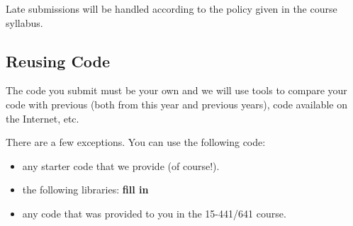 	Late submissions will be handled according to the policy given in the
        course syllabus.


\subsection{Reusing Code}
The code you submit must be your own and we will use tools to compare your code with previous (both from this year and previous years), 
code available on the Internet, etc.  

There are a few exceptions.  You can use the following code:
\begin{itemize}
\item any starter code that we provide (of course!).

\item the following libraries:  \textbf{fill in}

\item any code that was provided to you in the 15-441/641 course.  

\end{itemize}

